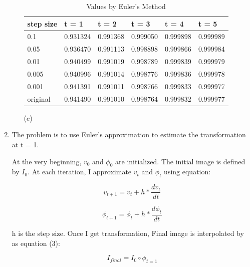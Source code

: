 \documentclass[11pt]{article}
\begin{document}
\begin{enumerate}
\begin{enumerate}
\begin{table}[h!]
\begin{center}
			\label{tab:table1}
			\begin{tabular}{llllll} %
				\textbf{step size} & \textbf{t = 1} & \textbf{t = 2}& \textbf{t = 3}& \textbf{t = 4}& \textbf{t = 5}\\
				\hline
				0.1 & 0.931324 & 0.991368 & 0.999050 & 0.999898 & 0.999989\\
				0.05 & 0.936470 & 0.991113 & 0.998898 & 0.999866 & 0.999984\\
				0.01 & 0.940499 & 0.991019 & 0.998789 & 0.999839 & 0.999979\\
				0.005 & 0.940996 & 0.991014 & 0.998776 & 0.999836 & 0.999978\\
				0.001 & 0.941391 & 0.991011 & 0.998766 & 0.999833 & 0.999977\\
				\hline
				original & 0.941490 & 0.991010 & 0.998764 & 0.999832 & 0.999977\\ 
				\hline
			\end{tabular}
			\caption{Values by Euler's Method}
		\end{center}
	\end{table}
	
	\item[(c)]
	
	
\end{enumerate}

\item 
The problem is to use Euler's approximation to estimate the transformation at t = 1.

At the very beginning, $v_{0}$ and $\phi_{0}$ are initialized. The initial image is defined by $I_{0}$. At each iteration, I approximate $v_{t}$ and $\phi_{t}$ using equation:

\begin{equation}
v_{t+1}=v_{t}+h*\frac{dv_{t}}{dt}
\end{equation}

\begin{equation}
\phi_{t+1}=\phi_{t}+h*\frac{d\phi_{t}}{dt}
\end{equation}

h is the step size. Once I get transformation, Final image is interpolated by as equation (3):

\begin{equation}
I_{final}=I_{0}\circ \phi_{t=1}
\end{equation}

\begin{enumerate}


\end{enumerate}
\end{enumerate}
\end{document}
